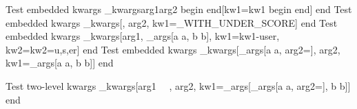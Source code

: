 \documentclass{article}
\author{Macro Kwarg Test}
\begin{document}
	Test embedded kwargs \pym\macro_kwargs{arg1}{arg2 begin \SIMPLEDEF end}[kw1=kw1 begin \SIMPLEDEF end] end
	Test embedded kwargs \pym\macro_kwargs[\randommacro{}, arg2, kw1=\DEF_WITH_UNDER_SCORE] end
	Test embedded kwargs \pym\macro_kwargs[arg1, \pym\emb_args[a a, b b], kw1=kw1-user, kw2={kw2=u,s,er}] end
	Test embedded kwargs \pym\macro_kwargs[\pym\emb_args[a a, arg2=\test{}{}], arg2, kw1=\pym\emb_args[a a, b b]] end

	Test two-level kwargs \pym\macro_kwargs[arg1 \ \ , arg2, kw1=\pym\emb_args[\pym\emb_args[a a, arg2=\test{}{}], b b]] end
\end{document}

